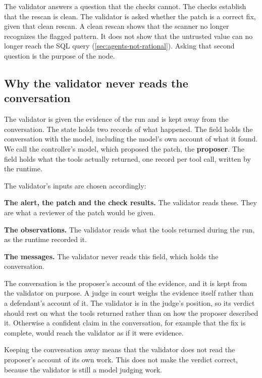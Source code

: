 The validator answers a question that the checks cannot. The checks establish that the rescan is
clean. The validator is asked whether the patch is a correct fix, given that clean rescan. A clean
rescan shows that the scanner no longer recognizes the flagged pattern. It does not show that the
untrusted value can no longer reach the SQL query (\cref{sec:agents-not-rational}). Asking that second
question is the purpose of the node.

\subsection{Why the validator never reads the conversation}
\label{sec:planning-validator-inputs}

The validator is given the evidence of the run and is kept away from the conversation. The state
holds two records of what happened. The  field holds the conversation with the
model, including the model's own account of what it found. We call the controller's model, which
proposed the patch, the \textbf{proposer}. The  field holds what the tools
actually returned, one record per tool call, written by the runtime.

The validator's inputs are chosen accordingly:
\bi
\item \textbf{The alert, the patch and the check results.} The validator reads these. They are what
a reviewer of the patch would be given.
\item \textbf{The observations.} The validator reads what the tools returned during the run, as the
runtime recorded it.
\item \textbf{The messages.} The validator never reads this field, which holds the conversation.
\ei

The conversation is the proposer's account of the evidence, and it is kept from the validator on
purpose. A judge in court weighs the evidence itself rather than a defendant's account of it. The
validator is in the judge's position, so its verdict should rest on what the tools returned rather
than on how the proposer described it. Otherwise a confident claim in the conversation, for example
that the fix is complete, would reach the validator as if it were evidence.

Keeping the conversation away means that the validator does not read the proposer's account of its
own work. This does not make the verdict correct, because the validator is still a model judging
work.

